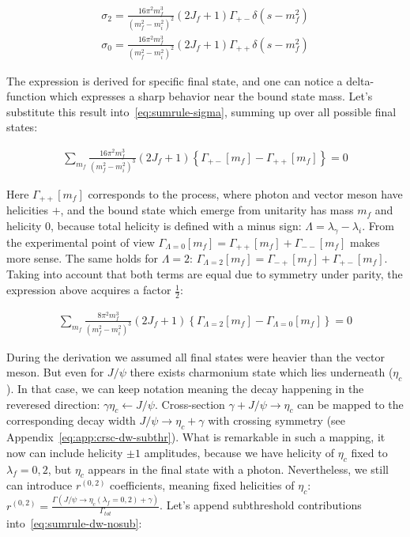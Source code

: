 \begin{align} \label{eq:crsc-dw}
    \sigma_{2} = \frac{16 \pi^2 m_f^3}{(m_f^2 - m_i^2)^2} (2J_f + 1) \Gamma_{+-} \delta(s - m_f^2) \\
    \sigma_{0} = \frac{16 \pi^2 m_f^3}{(m_f^2 - m_i^2)^2} (2J_f + 1) \Gamma_{++} \delta(s - m_f^2)
\end{align}

The expression is derived for specific final state, and one can notice a delta-function which expresses a sharp behavior near the bound state mass. Let's substitute this result into~\cref{eq:sumrule-sigma}, summing up over all possible final states:

\begin{align}
    \sum_{m_f} \frac{16 \pi^2 m_f^3}{(m_f^2 - m_i^2)^3} (2J_f+1) \left\{ \Gamma_{+-}[m_f] - \Gamma_{++}[m_f] \right\} = 0
\end{align}

Here $\Gamma_{++}[m_f]$ corresponds to the process, where photon and vector meson have helicities $+$, and the bound state which emerge from unitarity has mass $m_f$ and helicity $0$, because total helicity is defined with a minus sign: $\Lambda = \lambda_\gamma - \lambda_i$. From the experimental point of view $\Gamma_{\Lambda=0}[m_f] = \Gamma_{++}[m_f] + \Gamma_{--}[m_f]$ makes more sense. The same holds for $\Lambda=2$: $\Gamma_{\Lambda=2}[m_f] = \Gamma_{-+}[m_f] + \Gamma_{+-}[m_f]$. Taking into account that both terms are equal due to symmetry under parity, the expression above acquires a factor $\frac{1}{2}$:


\begin{align} \label{eq:sumrule-dw-nosub}
    \sum_{m_f} \frac{8 \pi^2 m_f^3}{(m_f^2 - m_i^2)^3} (2J_f+1) \left\{\Gamma_{\Lambda=2}[m_f] - \Gamma_{\Lambda=0}[m_f] \right\} = 0
\end{align}

During the derivation we assumed all final states were heavier than the vector meson. But even for $J/\psi$ there exists charmonium state which lies underneath ($\eta_c$). In that case, we can keep notation meaning the decay happening in the reveresed direction: $\gamma \eta_c \leftarrow J/\psi$. Cross-section $\gamma + J/\psi \rightarrow \eta_c$ can be mapped to the corresponding decay width $J/\psi \rightarrow \eta_c + \gamma$ with crossing symmetry (see Appendix~\cref{eq:app:crsc-dw-subthr}). What is remarkable in such a mapping, it now can include helicity $\pm1$ amplitudes, because we have helicity of $\eta_c$ fixed to $\lambda_f = 0, 2$, but $\eta_c$ appears in the final state with a photon. Nevertheless, we still can introduce $r^{(0,2)}$ coefficients, meaning fixed helicities of $\eta_c$: $r^{(0,2)} = \frac{\Gamma(J/\psi \rightarrow \eta_c(\lambda_f = 0, 2) + \gamma)}{\Gamma_{tot}}$. Let's append subthreshold contributions into~\cref{eq:sumrule-dw-nosub}:

